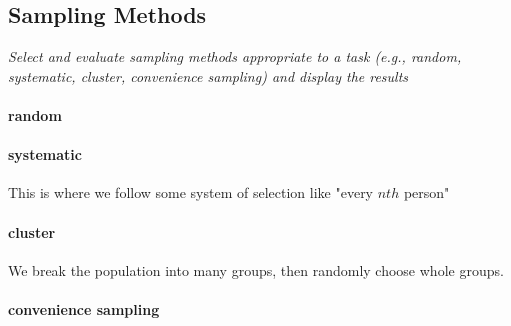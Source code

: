 \subsection[sampling]{Sampling Methods}


\textit{Select and evaluate sampling methods appropriate to a task (e.g., random, systematic, cluster, convenience sampling) and display the results}

\vspace{.5cm}

\paragraph*{random }

\paragraph*{systematic} This is where we follow some system of selection like "every $nth$ person"

\paragraph*{cluster} We break the population into many groups, then randomly choose whole groups.

\paragraph*{convenience sampling}